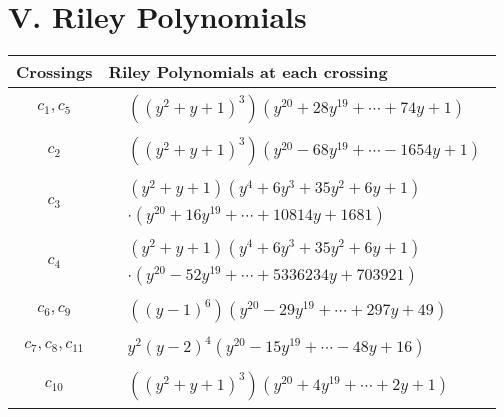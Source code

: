 \documentclass[1p]{elsarticle_modified}
\theoremstyle{definition}
\begin{document}
\centering \section*{ V. Riley Polynomials}
\begin{tabular}{m{50pt}|m{274pt}}
Crossings & \hspace{64pt}Riley Polynomials at each crossing \\
\hline $$\begin{aligned}c_{1},c_{5}\end{aligned}$$&$\begin{aligned}
&((y^2+y+1)^3)(y^{20}+28 y^{19}+\cdots+74 y+1)
\end{aligned}$\\
\hline $$\begin{aligned}c_{2}\end{aligned}$$&$\begin{aligned}
&((y^2+y+1)^3)(y^{20}-68 y^{19}+\cdots-1654 y+1)
\end{aligned}$\\
\hline $$\begin{aligned}c_{3}\end{aligned}$$&$\begin{aligned}
&(y^2+y+1)(y^4+6 y^3+35 y^2+6 y+1)\\
&\cdot(y^{20}+16 y^{19}+\cdots+10814 y+1681)
\end{aligned}$\\
\hline $$\begin{aligned}c_{4}\end{aligned}$$&$\begin{aligned}
&(y^2+y+1)(y^4+6 y^3+35 y^2+6 y+1)\\
&\cdot(y^{20}-52 y^{19}+\cdots+5336234 y+703921)
\end{aligned}$\\
\hline $$\begin{aligned}c_{6},c_{9}\end{aligned}$$&$\begin{aligned}
&((y-1)^6)(y^{20}-29 y^{19}+\cdots+297 y+49)
\end{aligned}$\\
\hline $$\begin{aligned}c_{7},c_{8},c_{11}\end{aligned}$$&$\begin{aligned}
&y^2(y-2)^4(y^{20}-15 y^{19}+\cdots-48 y+16)
\end{aligned}$\\
\hline $$\begin{aligned}c_{10}\end{aligned}$$&$\begin{aligned}
&((y^2+y+1)^3)(y^{20}+4 y^{19}+\cdots+2 y+1)
\end{aligned}$\\
\hline
\end{tabular}
\vskip 2pc
\end{document}
